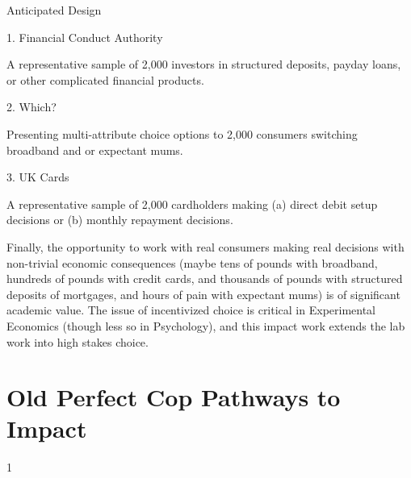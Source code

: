 Anticipated Design

1. Financial Conduct
Authority

A representative sample of 2,000 investors in structured
deposits, payday loans, or other complicated financial
products.

2. Which?

Presenting multi-attribute choice options to 2,000
consumers switching broadband and or expectant mums.

3. UK Cards

A representative sample of 2,000 cardholders making (a)
direct debit setup decisions or (b) monthly repayment
decisions.

Finally, the opportunity to work with real consumers making real decisions with non-trivial
economic consequences (maybe tens of pounds with broadband, hundreds of pounds with
credit cards, and thousands of pounds with structured deposits of mortgages, and hours of
pain with expectant mums) is of significant academic value. The issue of incentivized choice
is critical in Experimental Economics (though less so in Psychology), and this impact work
extends the lab work into high stakes choice.

\section{Old Perfect Cop Pathways to Impact}


1

